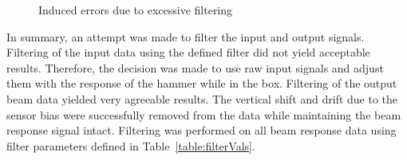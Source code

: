 \documentclass[paper=a4, fontsize=12pt]{scrartcl} %
\begin{document}
	\begin{figure}[H]
		\centering
		\quad
		\caption{Induced errors due to excessive filtering}
		\label{fig:badFiltering}
	\end{figure}
%
In summary, an attempt was made to filter the input and output signals. Filtering of the input data using the defined filter did not yield acceptable results. Therefore, the decision was made to use raw input signals and adjust them with the response of the hammer while in the box. Filtering of the output beam data yielded very agreeable results. The vertical shift and drift due to the sensor bias were successfully removed from the data while maintaining the beam response signal intact. Filtering was performed on all beam response data using filter parameters defined in Table~\ref{table:filterVals}.
%
%
\end{document}

